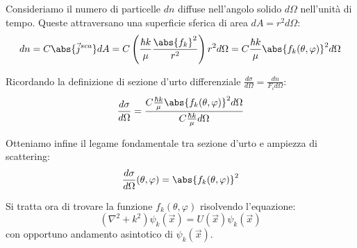 Consideriamo il numero di particelle \( dn \) diffuse nell'angolo solido \( d\Omega \) nell'unità di tempo. Queste attraversano una superficie sferica di area \( dA = r^2 d\Omega \):
\[
    dn = C \abs{\vec{j}^{sca}} dA = C \left( \frac{\hbar k}{\mu} \frac{\abs{f_k}^2}{r^2} \right) r^2 d\Omega = C \frac{\hbar k}{\mu} \abs{f_k(\theta, \varphi)}^2 d\Omega
\]

Ricordando la definizione di sezione d'urto differenziale \( \frac{d\sigma}{d\Omega} = \frac{dn}{F_i d\Omega} \):
\[
    \frac{d\sigma}{d\Omega} = \frac{C \frac{\hbar k}{\mu} \abs{f_k(\theta, \varphi)}^2 d\Omega}{C \frac{\hbar k}{\mu} d\Omega}
\]

Otteniamo infine il legame fondamentale tra sezione d'urto e ampiezza di scattering:
\begin{equation} \label{eq:diff_cross_section}
    \frac{d\sigma}{d\Omega}(\theta, \varphi) = \abs{f_k(\theta, \varphi)}^2
\end{equation}

Si tratta ora di trovare la funzione \(f_k(\theta, \varphi)\) risolvendo l'equazione:
\[
    (\nabla^2+k^2)\psi_k(\vec{x})= U(\vec{x})\psi_k(\vec{x})    
\]
con opportuno andamento asintotico di \(\psi_k(\vec{x})\).

